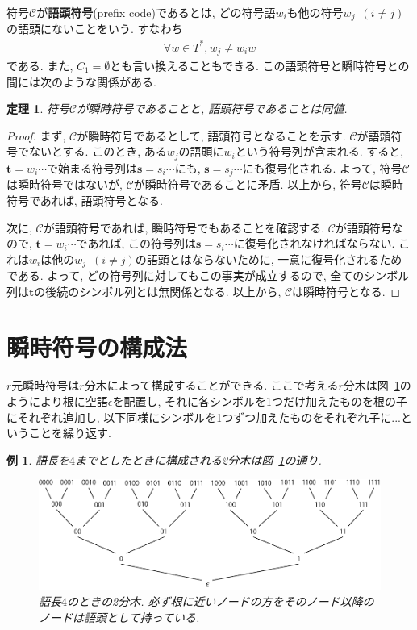 \documentclass[12pt]{ltjsarticle}
\newcommand*{\fgref}[1]{図~\ref{#1}}
\newtheorem{example}{例}
\newtheorem{theorem}{定理}
\begin{document}
符号$\mathcal{C}$が\textbf{語頭符号}(prefix code)であるとは, どの符号語$w_i$も他の符号$w_j \enspace (i \neq j)$の語頭にないことをいう.
すなわち
\begin{align*}
  \forall w \in T^*, w_j \neq w_i w
\end{align*}
である.
また, $C_1 = \emptyset$とも言い換えることもできる.
この語頭符号と瞬時符号との間には次のような関係がある.
\begin{screen}
  \begin{theorem}
    符号$\mathcal{C}$が瞬時符号であることと, 語頭符号であることは同値.
  \end{theorem}
\end{screen}
\begin{proof}
  まず, $\mathcal{C}$が瞬時符号であるとして, 語頭符号となることを示す.
  $\mathcal{C}$が語頭符号でないとする.
  このとき, ある$w_j$の語頭に$w_i$という符号列が含まれる.
  すると, $\boldsymbol{t} = w_i \cdots$で始まる符号列は$\boldsymbol{s} = s_i \cdots$にも,
  $\boldsymbol{s} = s_j \cdots$にも復号化される.
  よって, 符号$\mathcal{C}$は瞬時符号ではないが, $\mathcal{C}$が瞬時符号であることに矛盾.
  以上から, 符号$\mathcal{C}$は瞬時符号であれば, 語頭符号となる.

  次に, $\mathcal{C}$が語頭符号であれば, 瞬時符号でもあることを確認する.
  $\mathcal{C}$が語頭符号なので, $\boldsymbol{t} = w_i \cdots$であれば,
  この符号列は$\boldsymbol{s} = s_i \cdots$に復号化されなければならない.
  これは$w_i$は他の$w_j \enspace (i \neq j)$の語頭とはならないために, 一意に復号化されるためである.
  よって, どの符号列に対してもこの事実が成立するので,
  全てのシンボル列は$\boldsymbol{t}$の後続のシンボル列とは無関係となる.
  以上から, $\mathcal{C}$は瞬時符号となる.
\end{proof}

\section{瞬時符号の構成法}
$r$元瞬時符号は$r$分木によって構成することができる.
ここで考える$r$分木は\fgref{fg:r-ary-tree}のようにより根に空語$\epsilon$を配置し,
それに各シンボルを1つだけ加えたものを根の子にそれぞれ追加し,
以下同様にシンボルを1つずつ加えたものをそれぞれ子に...ということを繰り返す.
\begin{example}
  \label{ex:make-tree}
  語長を$4$までとしたときに構成される2分木は\fgref{fg:r-ary-tree}の通り.
  \begin{figure}
    \centering
    \includegraphics{image/2分木.pdf}
    \caption{語長$4$のときの2分木. 必ず根に近いノードの方をそのノード以降のノードは語頭として持っている.}
    \label{fg:r-ary-tree}
  \end{figure}
\end{example}
\end{document}
